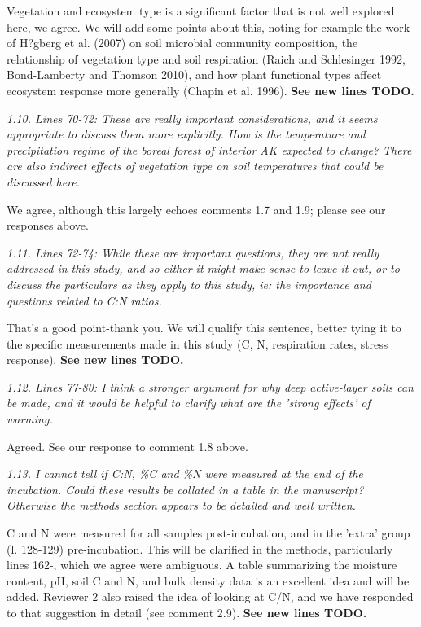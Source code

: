\documentclass[11pt, oneside]{article}
\begin{document}
Vegetation and ecosystem type is a significant factor that is not well explored here, we agree. We will add some points about this, noting for example the work of H?gberg et al. (2007) on soil microbial community composition, the relationship of vegetation type and soil respiration (Raich and Schlesinger 1992, Bond-Lamberty and Thomson 2010), and how plant functional types affect ecosystem response more generally (Chapin et al. 1996). {\bf See new lines TODO.}

\medskip
{\it 1.10. Lines 70-72: These are really important considerations, and it seems appropriate to discuss them more explicitly. How is the temperature and precipitation regime of the boreal forest of interior AK expected to change? There are also indirect effects of vegetation type on soil temperatures that could be discussed here. }

We agree, although this largely echoes comments 1.7 and 1.9; please see our responses above.

\medskip
{\it 1.11. Lines 72-74: While these are important questions, they are not really addressed in this study, and so either it might make sense to leave it out, or to discuss the particulars as they apply to this study, ie: the importance and questions related to C:N ratios. }

That's a good point-thank you. We will qualify this sentence, better tying it to the specific measurements made in this study (C, N, respiration rates, stress response). {\bf See new lines TODO.}

\medskip
{\it 1.12. Lines 77-80: I think a stronger argument for why deep active-layer soils can be made, and it would be helpful to clarify what are the 'strong effects' of warming. }

Agreed. See our response to comment 1.8 above.

\medskip
{\it 1.13. I cannot tell if C:N, \%C and \%N were measured at the end of the incubation. Could these results be collated in a table in the manuscript? Otherwise the methods section appears to be detailed and well written. }

C and N were measured for all samples post-incubation, and in the 'extra' group (l. 128-129) pre-incubation. This will be clarified in the methods, particularly lines 162-, which we agree were ambiguous. A table summarizing the moisture content, pH, soil C and N, and bulk density data is an excellent idea and will be added. Reviewer 2 also raised the idea of looking at C/N, and we have responded to that suggestion in detail (see comment 2.9). {\bf See new lines TODO.}
\end{document}
